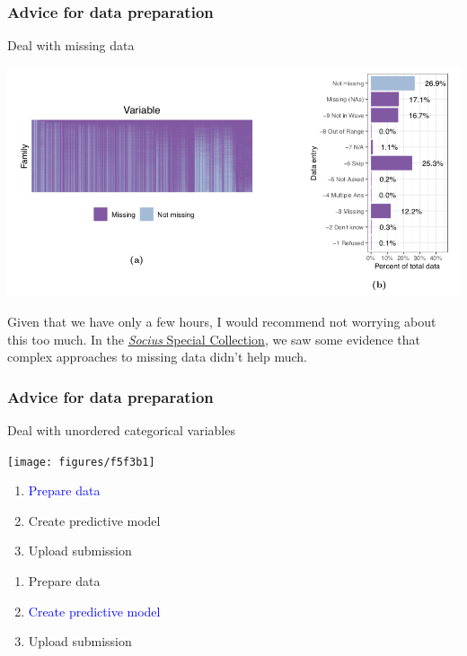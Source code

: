 \documentclass[aspectratio=169]{beamer}
\begin{document}
\begin{frame}
\frametitle{Advice for data preparation}

Deal with missing data

\begin{center}
\includegraphics[width = \textwidth]{figures/salganik_measuring_2020_figs1}
\end{center}

\vfill
Given that we have only a few hours, I would recommend not worrying about this too much.  In the \href{https://journals.sagepub.com/topic/collections-srd/srd-1-fragile_families/srd}{\textit{Socius} Special Collection}, we saw some evidence that complex approaches to missing data didn't help much.
\end{frame}
\begin{frame}
\frametitle{Advice for data preparation}

Deal with unordered categorical variables

\begin{center}
\texttt{[image: figures/f5f3b1]}
\end{center}

\end{frame}
\begin{frame}

\begin{enumerate}
\item \textcolor{blue}{Prepare data}
\item Create predictive model
\item Upload submission
\end{enumerate}

\end{frame}
\begin{frame}

\begin{enumerate}
\item Prepare data
\item \textcolor{blue}{Create predictive model}
\item Upload submission
\end{enumerate}

\end{frame}
\end{document}
